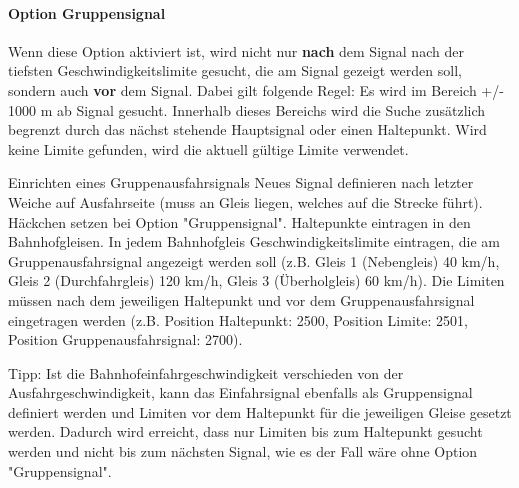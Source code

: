 \paragraph{Option Gruppensignal}
\label{paragraph.editor.gleis.gleiseigenschaften.signal.optiongruppensignal}

Wenn diese Option aktiviert ist, wird nicht nur \textbf{nach} dem Signal nach der tiefsten Geschwindigkeitslimite gesucht, die am Signal gezeigt werden soll, sondern auch \textbf{vor} dem Signal. Dabei gilt folgende Regel: Es wird im Bereich +/- 1000 m ab Signal gesucht. Innerhalb dieses Bereichs wird die Suche zusätzlich begrenzt durch das nächst stehende Hauptsignal oder einen Haltepunkt. Wird keine Limite gefunden, wird die aktuell gültige Limite verwendet.

Einrichten eines Gruppenausfahrsignals
Neues Signal definieren nach letzter Weiche auf Ausfahrseite (muss an Gleis liegen, welches auf die Strecke führt). Häckchen setzen bei Option "Gruppensignal". Haltepunkte eintragen in den Bahnhofgleisen. In jedem Bahnhofgleis Geschwindigkeitslimite eintragen, die am Gruppenausfahrsignal angezeigt werden soll (z.B. Gleis 1 (Nebengleis) 40 km/h, Gleis 2 (Durchfahrgleis) 120 km/h, Gleis 3 (Überholgleis) 60 km/h). Die Limiten müssen nach dem jeweiligen Haltepunkt und vor dem Gruppenausfahrsignal eingetragen werden (z.B. Position Haltepunkt: 2500, Position Limite: 2501, Position Gruppenausfahrsignal: 2700).

Tipp: Ist die Bahnhofeinfahrgeschwindigkeit verschieden von der Ausfahrgeschwindigkeit, kann das Einfahrsignal ebenfalls als Gruppensignal definiert werden und Limiten vor dem Haltepunkt für die jeweiligen Gleise gesetzt werden. Dadurch wird erreicht, dass nur Limiten bis zum Haltepunkt gesucht werden und nicht bis zum nächsten Signal, wie es der Fall wäre ohne Option "Gruppensignal".